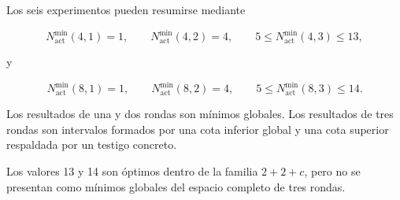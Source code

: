 Los seis experimentos pueden resumirse mediante

\[
N_{\mathrm{act}}^{\min}(4,1)=1,
\qquad
N_{\mathrm{act}}^{\min}(4,2)=4,
\qquad
5
\leq
N_{\mathrm{act}}^{\min}(4,3)
\leq
13,
\]

y

\[
N_{\mathrm{act}}^{\min}(8,1)=1,
\qquad
N_{\mathrm{act}}^{\min}(8,2)=4,
\qquad
5
\leq
N_{\mathrm{act}}^{\min}(8,3)
\leq
14.
\]

Los resultados de una y dos rondas son mínimos globales. Los resultados de
tres rondas son intervalos formados por una cota inferior global y una cota
superior respaldada por un testigo concreto.

Los valores 13 y 14 son óptimos dentro de la familia $2+2+c$, pero no se
presentan como mínimos globales del espacio completo de tres rondas.